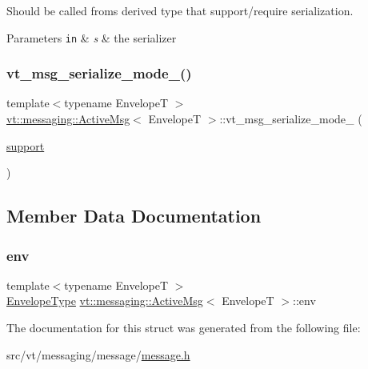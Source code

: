 Should be called froms derived type that support/require serialization.


\begin{DoxyParams}[1]{Parameters}
\mbox{\tt in}  & {\em s} & the serializer \\
\hline
\end{DoxyParams}
\mbox{\label{structvt_1_1messaging_1_1_active_msg_a97b214f27e477ea5951a2d697f2256e7}} 
\subsubsection{\texorpdfstring{vt\+\_\+msg\+\_\+serialize\+\_\+mode\+\_\+()}{vt\_msg\_serialize\_mode\_()}}
{\footnotesize\ttfamily template$<$typename EnvelopeT $>$ \\
\hyperlink{structvt_1_1messaging_1_1_active_msg}{vt\+::messaging\+::\+Active\+Msg}$<$ EnvelopeT $>$\+::vt\+\_\+msg\+\_\+serialize\+\_\+mode\+\_\+ (\begin{DoxyParamCaption}\item[{\hyperlink{namespacevt_1_1messaging_a436c5b9fc7f591e5978a136999cb9ef8a434990c8a25d2be94863561ae98bd682}{support}}]{ }\end{DoxyParamCaption})}



\subsection{Member Data Documentation}
\mbox{\label{structvt_1_1messaging_1_1_active_msg_ae3f8937b2c95f548f1a3c3340b887c09}} 
\subsubsection{\texorpdfstring{env}{env}}
{\footnotesize\ttfamily template$<$typename EnvelopeT $>$ \\
\hyperlink{structvt_1_1messaging_1_1_active_msg_a6e2b0541c25f7290555bf50d7cc05874}{Envelope\+Type} \hyperlink{structvt_1_1messaging_1_1_active_msg}{vt\+::messaging\+::\+Active\+Msg}$<$ EnvelopeT $>$\+::env}



The documentation for this struct was generated from the following file\+:\begin{DoxyCompactItemize}
\item 
src/vt/messaging/message/\hyperlink{message_2message_8h}{message.\+h}\end{DoxyCompactItemize}
